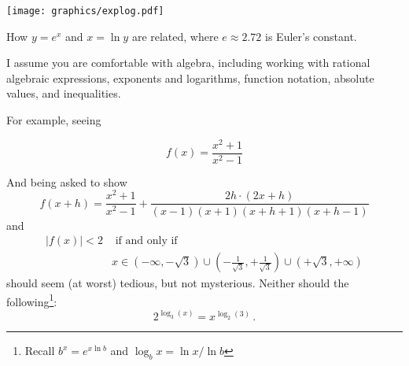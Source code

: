 \begin{marginfigure}
\begin{center}
\texttt{[image: graphics/explog.pdf]}
\end{center}
\caption{How $y=e^x$ and $x=\ln y$ are related, where $e \approx 2.72$ is Euler's constant.}
\label{fig:explog}
\end{marginfigure}

I assume you are comfortable with algebra, including working with rational algebraic expressions, exponents and logarithms, function notation, absolute values, and inequalities.

For example, seeing 

\begin{equation*}
f(x)=\frac{x^2+1}{x^2-1}
\end{equation*}

And being asked to show
\begin{equation*}
    f(x+h)=\frac{x^2+1}{x^2-1}+ \frac{2h\cdot(2x+h)}{(x-1)(x+1)(x+h+1)(x+h-1)}
\end{equation*}
and
\begin{align*}
  |f(x)|<2 & \text{ if and only if } \\
           &  x \in (-\infty,-\sqrt{3})\cup(-\frac{1}{\sqrt{3}},+\frac{1}{\sqrt{3}})\cup(+\sqrt{3},+\infty)
\end{align*}
should seem (at worst) tedious, but not mysterious.  Neither should the following\footnote{Recall $b^x=e^{x \ln b}$ and $\log_b x=\ln x/\ln b$}:
\begin{equation*}
    2^{\log_3(x)}=x^{\log_2(3)} \,.
\end{equation*}

